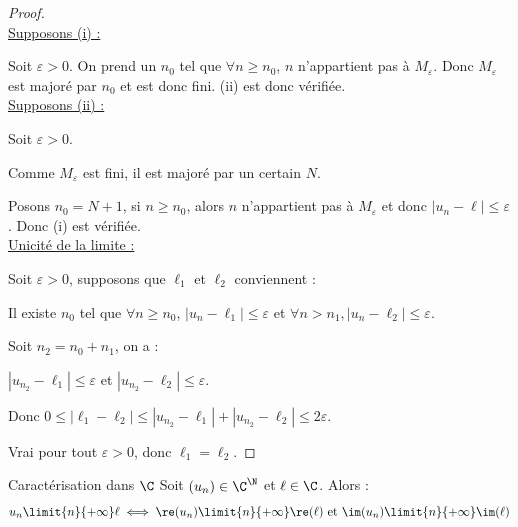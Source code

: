 \begin{proof}~\\
    \uline{Supposons (i) :}

    \vspace{0.2em}Soit $\varepsilon > 0$. On prend un $n_0$ tel que $\forall n \geqslant n_0$, $n$ n'appartient pas 
    à $M_\varepsilon$. Donc $M_\varepsilon$ est majoré par $n_0$ et est donc fini. (ii) est donc vérifiée.\\

    \uline{Supposons (ii) :}

    \vspace{0.2em}Soit $\varepsilon > 0$. 

    Comme $M_\varepsilon$ est fini, il est majoré par un certain $N$. 

    Posons $n_0 = N + 1$, si $n \geqslant n_0$, alors $n$ n'appartient pas à $M_\varepsilon$ et donc
    $|u_n - \ell| \leqslant \varepsilon$. Donc (i) est vérifiée.\\

    \uline{Unicité de la limite :}

    Soit $\varepsilon > 0$, supposons que $\ell_1$ et $\ell_2$ conviennent : 

    Il existe $n_0$ tel que $\forall n \geqslant n_0$, $|u_n - \ell_1| \leqslant \varepsilon$ et $\forall n > n_1, |u_n - \ell_2| \leqslant \varepsilon$.

    \vspace{0.2em} Soit $n_2 = n_0 + n_1$, on a :

    $|u_{n_2} - \ell_1| \leqslant \varepsilon$ et $|u_{n_2} - \ell_2| \leqslant \varepsilon$.

    Donc $0 \leqslant |\ell_1 - \ell_2| \leqslant |u_{n_2} - \ell_1| + |u_{n_2} - \ell_2| \leqslant 2\varepsilon$.

    Vrai pour tout $\varepsilon > 0$, donc $\ell_1 = \ell_2$.
\end{proof}


\begin{proposition}{Caractérisation dans $\C$}{}
    Soit $(u_n) \in \C^{\N}$ et $\ell \in \C$. Alors : 
    \[u_n \limit{n}{+\infty} \ell \iff \re(u_n) \limit{n}{+\infty} \re(\ell) ~ \text{et} ~ \im(u_n) \limit{n}{+\infty} \im(\ell)\]
\end{proposition}


